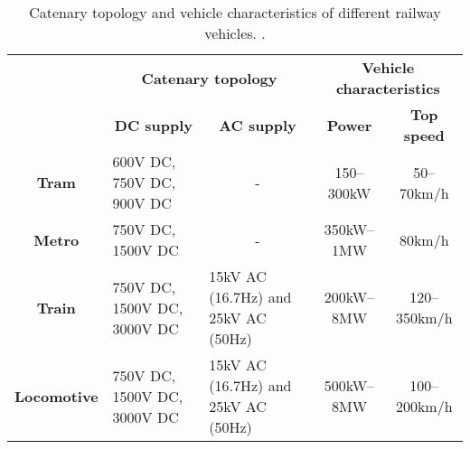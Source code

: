 \begin{table}[htbp]
	\centering
	\tiny
	\caption{Catenary topology and vehicle characteristics of different railway vehicles. \cite{abad2016}.}
	\begin{tabular}{|c|p{10.145em}p{10.355em}|cc|}
		\cmidrule{2-5}    \multicolumn{1}{c|}{} & \multicolumn{2}{c|}{\textbf{Catenary topology}} & \multicolumn{2}{c|}{\textbf{Vehicle characteristics}} \\
		\cmidrule{2-5}    \multicolumn{1}{c|}{} & \multicolumn{1}{c}{\textbf{DC supply}} & \multicolumn{1}{c|}{\textbf{AC supply}} & \textbf{Power} & \textbf{Top speed} \\
		\midrule
		\textbf{Tram} & 600V DC, 750V DC, 900V DC & \multicolumn{1}{c|}{-}     & 150–300kW & 50–70km/h \\
		\midrule
		\textbf{Metro} & 750V DC, 1500V DC & \multicolumn{1}{c|}{-}     & 350kW–1MW & 80km/h \\
		\midrule
		\textbf{Train} & 750V DC, 1500V DC, 3000V DC & 15kV AC (16.7Hz) and 25kV AC (50Hz) & 200kW–8MW & 120–350km/h \\
		\midrule
		\textbf{Locomotive} & 750V DC, 1500V DC, 3000V DC & 15kV AC (16.7Hz) and 25kV AC (50Hz) & 500kW–8MW & 100–200km/h \\
		\bottomrule
	\end{tabular}%
	\label{tab:31.t1}%
\end{table}%
